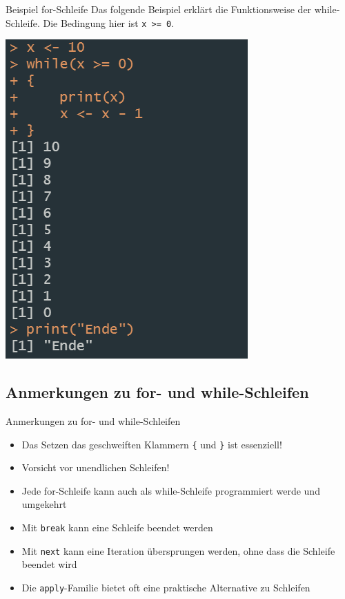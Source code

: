\documentclass[xcolor=dvipsnames, aspectratio = 169]{beamer}
\begin{document}
\begin{frame}[fragile]{Beispiel for-Schleife}
  Das folgende Beispiel erklärt die Funktionsweise der while-Schleife. Die Bedingung hier ist \verb+x >= 0+.\bigskip\\
  \begin{centering}
  \includegraphics[]{while1.png}
  \end{centering}
\end{frame}

\subsection*{Anmerkungen zu for- und while-Schleifen}

\begin{frame}[fragile]{Anmerkungen zu for- und while-Schleifen}
  \begin{itemize}
    \item Das Setzen das geschweiften Klammern \verb+{+ und \verb+}+ ist essenziell!
    \item Vorsicht vor unendlichen Schleifen!
    \item Jede for-Schleife kann auch als while-Schleife programmiert werde und umgekehrt
    \item Mit \verb+break+ kann eine Schleife beendet werden
    \item Mit \verb+next+ kann eine Iteration übersprungen werden, ohne dass die Schleife beendet wird
    \item Die \verb+apply+-Familie bietet oft eine praktische Alternative zu Schleifen
    \end{itemize}
\end{frame}
\end{document}
